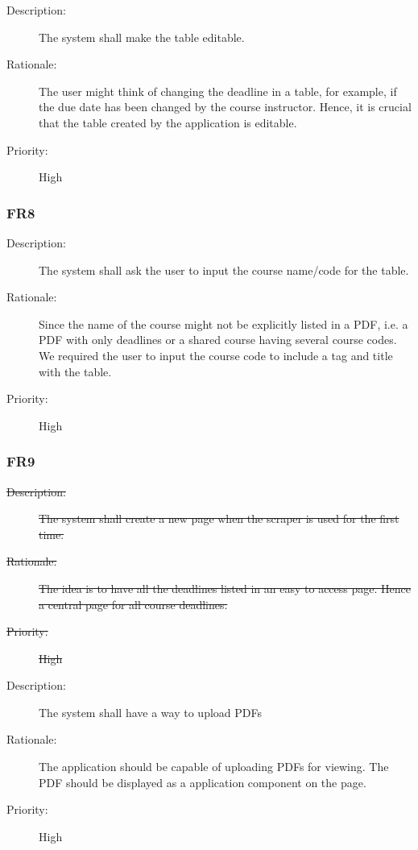 \documentclass[12pt, titlepage]{article}
\begin{document}
\begin{description}
  \item[Description:] The system shall make the table editable. 
  \item[Rationale:] The user might think of changing the deadline in a table, for example, if the due date has been changed by the course instructor. Hence, it is crucial that the table created by the application is editable. 
  \item[Priority:] High
\end{description}

\subsubsection{FR8}

\begin{description}
  \item[Description:] The system shall ask the user to input the course name/code for the table. 
  \item[Rationale:] Since the name of the course might not be explicitly listed in a PDF, i.e. a PDF with only deadlines or a shared course having several course codes. We required the user to input the course code to include a tag and title with the table. 
  \item[Priority:] High
\end{description}

\subsubsection{FR9}
\begin{description}
  \item[\sout{Description:}]\sout{ The system shall create a new page when the scraper is used for the first time.  }
  \item[\sout{Rationale:}] \sout{The idea is to have all the deadlines listed in an easy to access page. Hence a central page for all course deadlines. }
  \item[\sout{Priority:}]\sout{ High}
\end{description}

\begin{description}
  \item[Description:] The system shall have a way to upload PDFs
  \item[Rationale:] The application should be capable of uploading PDFs for viewing. The PDF should be displayed as a application component on the page.
  \item[Priority:] High
\end{description}
\end{document}
